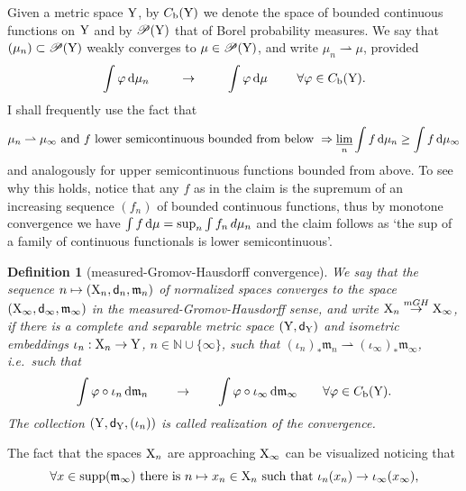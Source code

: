 \documentclass[11pt]{article}
\numberwithin{equation}{section}
\newtheorem{definition}[theorem]{Definition}
\newcommand{\N}{\mathbb{N}}
\newcommand{\pr}{\mathscr P}
\newcommand{\X}{{\rm X}}
\newcommand{\Y}{{\rm Y}}
\newcommand{\sfd}{{\sf d}}
\newcommand{\mm}{{\mathfrak m}}
\renewcommand{\d}{{\rm d}}
\newcommand{\limi}{\varliminf}
\renewcommand{\b}{{\rm b}}
\newcommand{\weakto}{\rightharpoonup}
\newcommand{\supp}{{\rm supp}}
\begin{document}
Given a  metric space $\Y$, by $C_\b(\Y)$ we denote the space of bounded continuous functions on $\Y$ and by $\pr(\Y)$ that of Borel probability measures. We say that $(\mu_n)\subset\pr(\Y)$ weakly converges to $\mu\in\pr(\Y)$, and write $\mu_n\weakto\mu$, provided
\[
\int\varphi\,\d\mu_n\ \qquad\to\ \qquad\int \varphi\,\d\mu\ \qquad\forall \varphi\in C_\b(\Y).
\]
I shall frequently use the fact that
\[
\mu_n\weakto\mu_\infty\text{ and $f$ lower semicontinuous bounded from below }\Rightarrow\limi_n\int f\,\d\mu_n\geq\int f\,\d\mu_\infty
\]
and analogously for upper semicontinuous functions bounded from above. To see why this holds, notice that any $f$ as in the claim is the supremum of an increasing sequence $(f_n)$ of bounded continuous functions, thus by monotone convergence we have $\int f\,\d\mu=\sup_n\int f_n\,d\mu_n$ and the claim follows as `the sup of a family of continuous functionals is lower semicontinuous'.
\begin{definition}[measured-Gromov-Hausdorff convergence]\label{def:mgh}
We say that the sequence $n\mapsto(\X_n,\sfd_n,\mm_n)$ of normalized spaces converges to the space $(\X_\infty,\sfd_\infty,\mm_\infty)$ in the measured-Gromov-Hausdorff sense, and write $\X_n\stackrel{mGH}\to\X_\infty$, if there is a complete and separable metric space $(\Y,\sfd_\Y)$ and isometric embeddings $\iota_n:\X_n\to\Y$, $n\in\N\cup\{\infty\}$, such that $(\iota_n)_*\mm_n\weakto(\iota_\infty)_*\mm_\infty$, i.e.\ such that
\[
\int\varphi\circ\iota_n\,\d\mm_n\qquad\to\qquad\int \varphi\circ\iota_\infty\,\d\mm_\infty\qquad\forall \varphi\in C_\b(\Y).
\]
The collection $(\Y,\sfd_\Y,(\iota_n))$ is called \emph{realization} of the convergence.
\end{definition}
The fact that the spaces $\X_n$ are approaching $\X_\infty$ can be visualized noticing that
\begin{equation}
\label{eq:vismgh}
\text{$\forall x\in\supp(\mm_\infty)$ there is $n\mapsto x_n\in\X_n$ such that $\iota_n(x_n)\to\iota_\infty(x_\infty)$,}
\end{equation}
\end{document}
